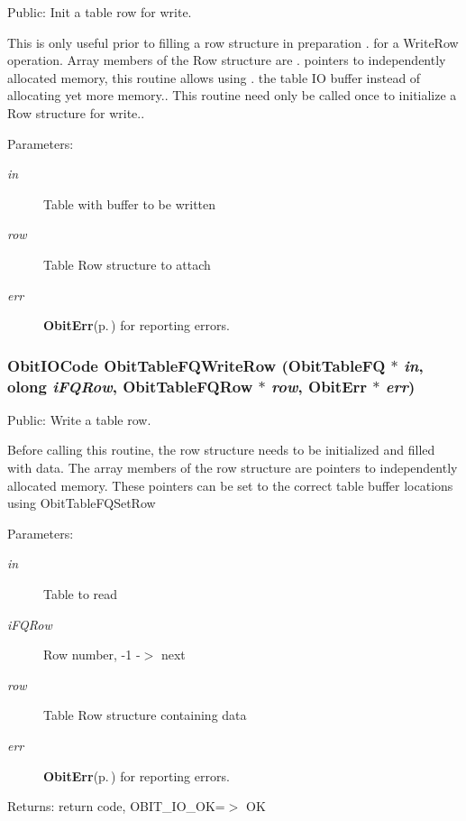 Public: Init a table row for write. 

This is only useful prior to filling a row structure in preparation . for a Write\-Row operation. Array members of the Row structure are . pointers to independently allocated memory, this routine allows using . the table IO buffer instead of allocating yet more memory.. This routine need only be called once to initialize a Row structure for write.. \begin{Desc}
\item[Parameters:]
\begin{description}
\item[{\em in}]Table with buffer to be written \item[{\em row}]Table Row structure to attach \item[{\em err}]{\bf Obit\-Err}{\rm (p.\,\pageref{structObitErr})} for reporting errors. \end{description}
\end{Desc}
\subsubsection{\setlength{\rightskip}{0pt plus 5cm}Obit\-IOCode Obit\-Table\-FQWrite\-Row ({\bf Obit\-Table\-FQ} $\ast$ {\em in}, {\bf olong} {\em i\-FQRow}, {\bf Obit\-Table\-FQRow} $\ast$ {\em row}, {\bf Obit\-Err} $\ast$ {\em err})}\label{ObitTableFQ_8h_a20}


Public: Write a table row. 

Before calling this routine, the row structure needs to be initialized and filled with data. The array members of the row structure are pointers to independently allocated memory. These pointers can be set to the correct table buffer locations using Obit\-Table\-FQSet\-Row \begin{Desc}
\item[Parameters:]
\begin{description}
\item[{\em in}]Table to read \item[{\em i\-FQRow}]Row number, -1 -$>$ next \item[{\em row}]Table Row structure containing data \item[{\em err}]{\bf Obit\-Err}{\rm (p.\,\pageref{structObitErr})} for reporting errors. \end{description}
\end{Desc}
\begin{Desc}
\item[Returns:]return code, OBIT\_\-IO\_\-OK=$>$ OK \end{Desc}
